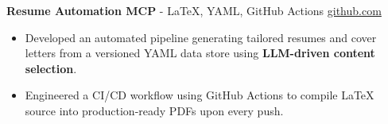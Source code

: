 \documentclass[11pt]{article}       %
\begin{document}

\textbf{Resume Automation MCP}{ - LaTeX, YAML, GitHub Actions} \hfill \href{https://github.com/Monica20030707/Tex_OrangeLeaf-mcp}{github.com} \\
\vspace{-9pt}
\begin{itemize}
  \item Developed an automated pipeline generating tailored resumes and cover letters from a versioned YAML data store using \textbf{LLM-driven content selection}.
  \item Engineered a CI/CD workflow using GitHub Actions to compile LaTeX source into production-ready PDFs upon every push.
\end{itemize}
\end{document}
